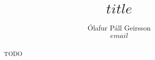 \documentclass[11pt,a4paper]{article}
\begin{document}
\title{$title$}
\author{Ólafur Páll Geirsson \\ \href{mailto:$email$}{$email$}}

\date{}
\maketitle

\begin{abstract}
    TODO
\end{abstract}


% 

\end{document}
